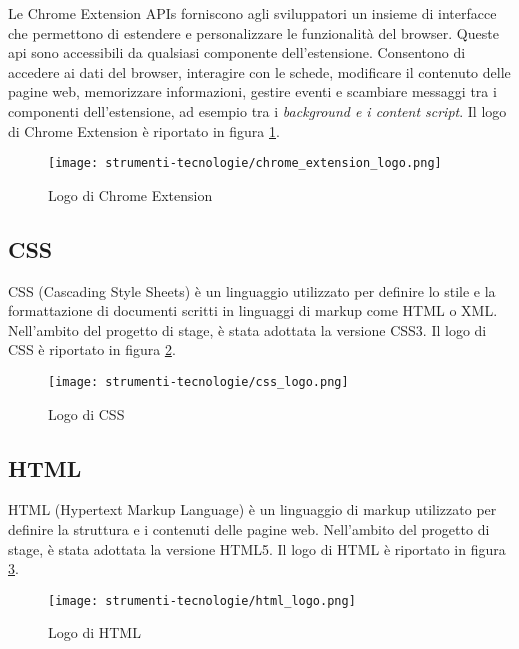 Le Chrome Extension APIs forniscono agli sviluppatori un insieme di interfacce che permettono di estendere e personalizzare le funzionalità del browser. Queste \gls{api} sono accessibili da qualsiasi componente dell’estensione. Consentono di accedere ai dati del browser, interagire con le schede, modificare il contenuto delle pagine web, memorizzare informazioni, gestire eventi e scambiare messaggi tra i componenti dell’estensione, ad esempio tra i \textit{background e i content script}. Il logo di Chrome Extension è riportato in figura \ref{fig:logo_chrome_extension}.

\begin{figure}[H]
  \centering 
  \texttt{[image: strumenti-tecnologie/chrome\_extension\_logo.png]} 
  \caption{Logo di Chrome Extension}
  \label{fig:logo_chrome_extension} 
\end{figure}

\subsection*{CSS}

CSS (Cascading Style Sheets) è un linguaggio utilizzato per definire lo stile e la formattazione di documenti scritti in linguaggi di markup come HTML o XML. Nell’ambito del progetto di stage, è stata adottata la versione CSS3. Il logo di CSS è riportato in figura \ref{fig:logo_css}.

\begin{figure}[H]
  \centering 
  \texttt{[image: strumenti-tecnologie/css\_logo.png]} 
  \caption{Logo di CSS}
  \label{fig:logo_css} 
\end{figure}

\subsection*{HTML}

HTML (Hypertext Markup Language) è un linguaggio di markup utilizzato per definire la struttura e i contenuti delle pagine web. Nell’ambito del progetto di stage, è stata adottata la versione HTML5. Il logo di HTML è riportato in figura \ref{fig:logo_html}.

\begin{figure}[H]
  \centering 
  \texttt{[image: strumenti-tecnologie/html\_logo.png]} 
  \caption{Logo di HTML}
  \label{fig:logo_html} 
\end{figure}

